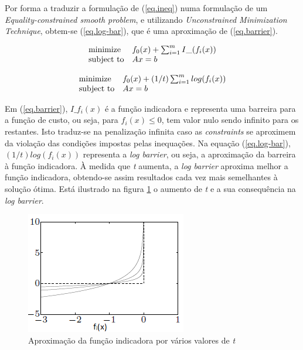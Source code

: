 \documentclass[a4paper]{IEEEtran}
\begin{document}
Por forma a traduzir a formulação de (\ref{eq.ineq}) numa formulação de um \textit{Equality-constrained smooth problem}, e utilizando \textit{Unconstrained Minimization Technique}, obtem-se (\ref{eq.log-bar}), que é uma aproximação de (\ref{eq.barrier}).

\begin{equation}
\label{eq.barrier}
\begin{array}[t]{ll} \text{minimize} & f_0(x) + \sum_{i=1}^{m} I\_(f_i(x)) \\
\text{subject to} &  Ax=b \end{array}
\end{equation}

\begin{equation}
\label{eq.log-bar}
\begin{array}[t]{ll} \text{minimize} & f_0(x) + (1/t) \sum_{i=1}^{m} log(f_i(x)) \\
\text{subject to} &  Ax=b \end{array}
\end{equation}

Em (\ref{eq.barrier}), $I\_f_i(x)$ é a função indicadora e representa uma barreira para a função de custo, ou seja, para $f_i(x) \leq 0$, tem valor nulo sendo infinito para os restantes. Isto traduz-se na penalização infinita caso as \textit{constraints} se aproximem da violação das condições impostas pelas inequações. Na equação (\ref{eq.log-bar}), $(1/t) log(f_i(x))$ representa a \textit{log barrier}, ou seja, a aproximação da barreira à função indicadora. À medida que \textit{t} aumenta, a \textit{log barrier} aproxima melhor a função indicadora, obtendo-se assim resultados cada vez mais semelhantes à solução ótima. Está ilustrado na figura \ref{fig:barrier} o aumento de \textit{t} e a sua consequência na \textit{log barrier}.

\begin{figure}[htp]
  \centering
  \captionsetup{font=scriptsize} 
  \includegraphics[scale=0.8]{./log-barrier}
  \caption{Aproximação da função indicadora por vários valores de \textit{t}}
  \label{fig:barrier}
\end{figure}
\end{document}
